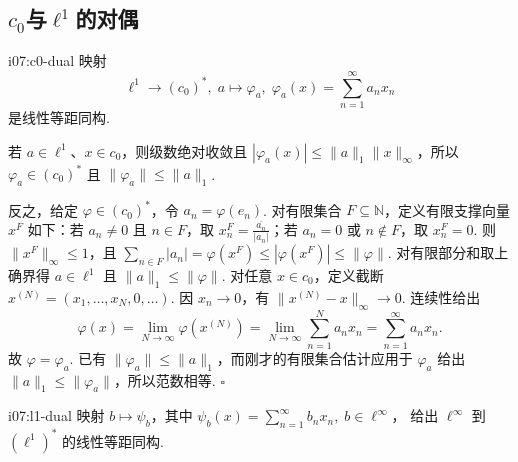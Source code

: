 \subsection{\texorpdfstring{\(\displaystyle c_0\)}{c0}与\texorpdfstring{\(\displaystyle \ell^1\)}{l1}的对偶}

\begin{FAProposition}{i07:c0-dual}
映射
\[
\ell^1\longrightarrow(c_0)^*,
\;
a\longmapsto\varphi_a,
\;
\varphi_a(x)=\sum_{n=1}^{\infty}a_nx_n
\]
是线性等距同构.
\end{FAProposition}

\begin{FAProof}
若 \(\displaystyle a\in\ell^1\)、\(\displaystyle x\in c_0\)，则级数绝对收敛且 \(\displaystyle |\varphi_a(x)|\leqslant\|a\|_1\|x\|_\infty\)，所以 \(\displaystyle \varphi_a\in(c_0)^*\) 且 \(\displaystyle \|\varphi_a\|\leqslant\|a\|_1\).

反之，给定 \(\displaystyle \varphi\in(c_0)^*\)，令 \(\displaystyle a_n=\varphi(e_n)\). 对有限集合 \(\displaystyle F\subseteq\mathbb N\)，定义有限支撑向量 \(\displaystyle x^F\) 如下：若 \(\displaystyle a_n\neq0\) 且 \(\displaystyle n\in F\)，取 \(\displaystyle x_n^F=\frac{\overline{a_n}}{|a_n|}\)；若 \(\displaystyle a_n=0\) 或 \(\displaystyle n\notin F\)，取 \(\displaystyle x_n^F=0\). 则 \(\displaystyle \|x^F\|_\infty\leqslant1\)，且 \(\displaystyle \sum_{n\in F}|a_n| =\varphi(x^F) \leqslant|\varphi(x^F)| \leqslant\|\varphi\|\).
对有限部分和取上确界得 \(\displaystyle a\in\ell^1\) 且 \(\displaystyle \|a\|_1\leqslant\|\varphi\|\). 对任意 \(\displaystyle x\in c_0\)，定义截断 \(\displaystyle x^{(N)}=(x_1,\dots,x_N,0,\dots)\).
因 \(\displaystyle x_n\to0\)，有 \(\displaystyle \|x^{(N)}-x\|_\infty\to0\). 连续性给出
\[
\varphi(x)
=\lim_{N\to\infty}\varphi(x^{(N)})
=\lim_{N\to\infty}\sum_{n=1}^Na_nx_n
=\sum_{n=1}^{\infty}a_nx_n.
\]
故 \(\displaystyle \varphi=\varphi_a\). 已有 \(\displaystyle \|\varphi_a\|\leqslant\|a\|_1\)，而刚才的有限集合估计应用于 \(\displaystyle \varphi_a\) 给出 \(\displaystyle \|a\|_1\leqslant\|\varphi_a\|\)，所以范数相等.
\hfill\(\square\)
\end{FAProof}

\begin{FAProposition}{i07:l1-dual}
映射 \(\displaystyle b\mapsto\psi_b\)，其中 \(\displaystyle \psi_b(x)=\sum_{n=1}^{\infty}b_nx_n, \; b\in\ell^\infty\)，
给出 \(\displaystyle \ell^\infty\) 到 \(\displaystyle (\ell^1)^*\) 的线性等距同构.
\end{FAProposition}

